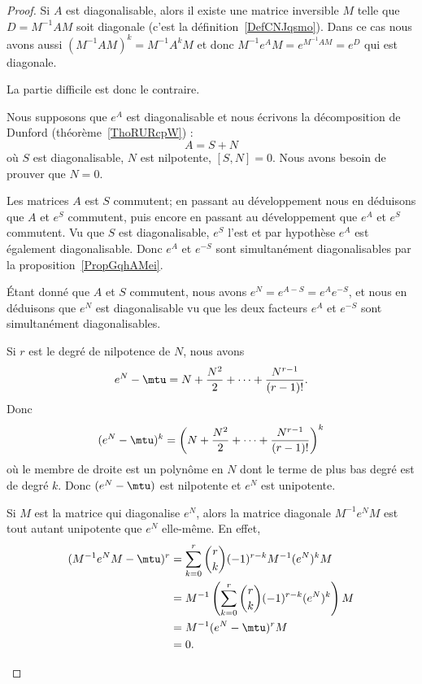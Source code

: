 \begin{proof}
	Si \( A\) est diagonalisable, alors il existe une matrice inversible \( M\) telle que \( D=M^{-1}AM\) soit diagonale (c'est la définition~\ref{DefCNJqsmo}). Dans ce cas nous avons aussi \( (M^{-1}AM)^k=M^{-1}A^kM\) et donc \( M^{-1}e^AM=e^{M^{-1}AM}=e^D\) qui est diagonale.

	La partie difficile est donc le contraire.

	\begin{subproof}
		Nous supposons que \( e^A\) est diagonalisable et nous écrivons la décomposition de Dunford (théorème~\ref{ThoRURcpW}) :
		\begin{equation}
			A=S+N
		\end{equation}
		où \( S\) est diagonalisable, \( N\) est nilpotente, \( [S,N]=0\). Nous avons besoin de prouver que \( N=0\).

		Les matrices \( A\) est \( S\) commutent; en passant au développement nous en déduisons que \( A\) et \( e^S\) commutent, puis encore en passant au développement que \( e^A\) et \( e^S\) commutent. Vu que \( S\) est diagonalisable, \( e^S\) l'est et par hypothèse \( e^A\) est également diagonalisable. Donc \( e^A\) et \( e^{-S}\) sont simultanément diagonalisables par la proposition~\ref{PropGqhAMei}.

		Étant donné que \( A\) et \( S\) commutent, nous avons \( e^N=e^{A-S}=e^Ae^{-S}\), et nous en déduisons que \( e^N\) est diagonalisable vu que les deux facteurs \( e^A\) et \( e^{-S}\) sont simultanément diagonalisables.

		\spitem[Unipotence]

		Si \( r\) est le degré de nilpotence de \( N\), nous avons
		\begin{equation}    \label{EqQHjvLZQ}
			e^N-\mtu=N+\frac{ N^2 }{2}+\cdots +\frac{ N^{r-1} }{ (r-1)! }.
		\end{equation}
		Donc
		\begin{equation}
			(e^N-\mtu)^k=\left( N+\frac{ N^2 }{2}+\cdots +\frac{ N^{r-1} }{ (r-1)! } \right)^k
		\end{equation}
		où le membre de droite est un polynôme en \( N\) dont le terme de plus bas degré est de degré \( k\). Donc \( (e^N-\mtu)\) est nilpotente et \( e^N\) est unipotente.

		Si \( M\) est la matrice qui diagonalise \( e^N\), alors la matrice diagonale \( M^{-1}e^NM\) est tout autant unipotente que \( e^N\) elle-même. En effet,
		\begin{subequations}
			\begin{align}
				(M^{-1}e^NM-\mtu)^r & =\sum_{k=0}^r\binom{ r }{ k }(-1)^{r-k}M^{-1}(e^N)^kM                \\
				                    & =M^{-1}\left( \sum_{k=0}^r\binom{ r }{ k }(-1)^{r-k}(e^N)^k \right)M \\
				                    & =M^{-1}(e^N-\mtu)^rM                                                 \\
				                    & =0.
			\end{align}
		\end{subequations}


\end{subproof}
\end{proof}
